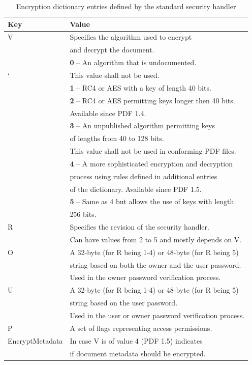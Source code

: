 \documentclass[11pt,oneside]{fithesis2}
\begin{document}
\begin{table}[hp]
	\centering
	\begin{tabular}{|l|l|}
               	\hline
		\textbf{Key}&\textbf{Value}\\
		\hline
		V&Specifies the algorithm used to encrypt \\
		&and decrypt the document.\\
		&\textbf{0} -- An algorithm that is undocumented.\\
	`	&This value shall not be used.\\
		&\textbf{1} -- RC4 or AES with a key of length 40 bits.\\
		&\textbf{2} -- RC4 or AES permitting keys longer then 40 bits.\\
		&Available since PDF 1.4.\\
		&\textbf{3} -- An unpublished algorithm permitting keys\\
		&of lengths from 40 to 128 bits.\\
		&This value shall not be used in conforming PDF files.\\
		&\textbf{4} -- A more sophisticated encryption and decryption\\
		&process using rules defined in additional entries\\
		&of the dictionary. Available since PDF 1.5.\\
		&\textbf{5} -- Same as 4 but allows the use of keys with length\\
		&256 bits.\\
	\hline
		R&Specifies the revision of the security handler.\\
		&Can have values from 2 to 5 and mostly depends on V.\\
	\hline
		O&A 32-byte (for R being 1-4) or 48-byte (for R being 5)\\ 
		&string based on both the owner and the user password.\\
		&Used in the owner password verification process.\\
	\hline
		U&A 32-byte (for R being 1-4) or 48-byte (for R being 5)\\ 
		&string based on the user password.\\
		&Used in the user or owner password verification process.\\
	\hline
		P&A set of flags representing access permissions.\\
	\hline
		EncryptMetadata& In case V is of value 4 (PDF 1.5) indicates\\
		&if document metadata should be encrypted.\\
	\hline
           \end{tabular}
	\caption{Encryption dictionary entries defined by the standard security handler \cite{pdf_spec}}
	\label{handler_entries}
\end{table}
\end{document}
